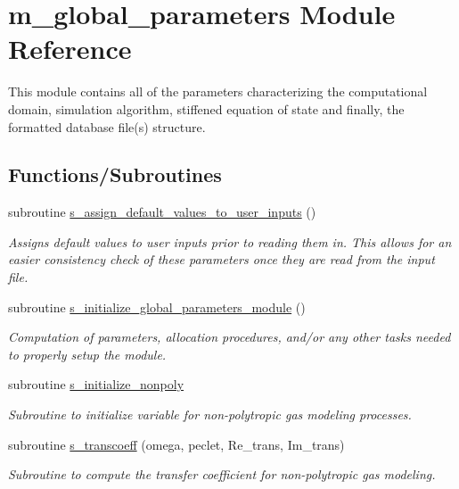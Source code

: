 \hypertarget{namespacem__global__parameters}{}\section{m\+\_\+global\+\_\+parameters Module Reference}
\label{namespacem__global__parameters}


This module contains all of the parameters characterizing the computational domain, simulation algorithm, stiffened equation of state and finally, the formatted database file(s) structure.  


\subsection*{Functions/\+Subroutines}
\begin{DoxyCompactItemize}
\item 
subroutine \hyperlink{namespacem__global__parameters_a433eac37597eb46a3cac84ca0471f5d3}{s\+\_\+assign\+\_\+default\+\_\+values\+\_\+to\+\_\+user\+\_\+inputs} ()
\begin{DoxyCompactList}\small\item\em Assigns default values to user inputs prior to reading them in. This allows for an easier consistency check of these parameters once they are read from the input file. \end{DoxyCompactList}\item 
subroutine \hyperlink{namespacem__global__parameters_a8a76198d180cb9736c21dde108cb0dbf}{s\+\_\+initialize\+\_\+global\+\_\+parameters\+\_\+module} ()
\begin{DoxyCompactList}\small\item\em Computation of parameters, allocation procedures, and/or any other tasks needed to properly setup the module. \end{DoxyCompactList}\item 
subroutine \hyperlink{namespacem__global__parameters_a1611e2cf82243c04b04a11281ef67993}{s\+\_\+initialize\+\_\+nonpoly}
\begin{DoxyCompactList}\small\item\em Subroutine to initialize variable for non-\/polytropic gas modeling processes. \end{DoxyCompactList}\item 
subroutine \hyperlink{namespacem__global__parameters_af52b102f1c17e28aa4ca3070f8806ca6}{s\+\_\+transcoeff} (omega, peclet, Re\+\_\+trans, Im\+\_\+trans)
\begin{DoxyCompactList}\small\item\em Subroutine to compute the transfer coefficient for non-\/polytropic gas modeling. \end{DoxyCompactList}\item 

\end{DoxyCompactItemize}
